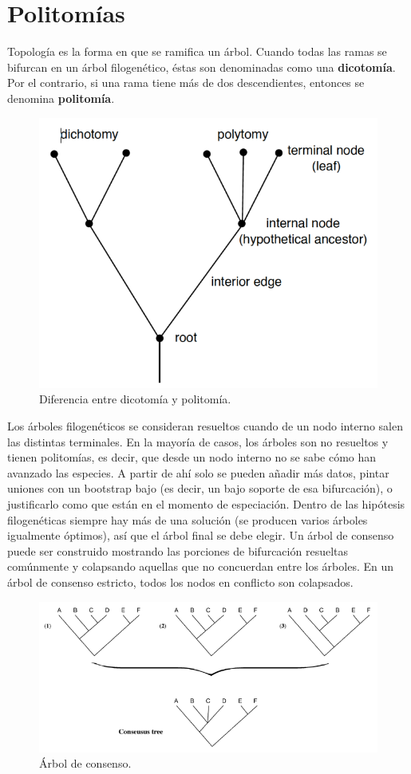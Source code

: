 \section{Politomías}
Topología es la forma en que se ramifica un árbol. Cuando todas las ramas se bifurcan en un árbol filogenético, éstas son denominadas como una \textbf{dicotomía}. Por el contrario, si una rama tiene más de dos descendientes, entonces se denomina \textbf{politomía}.

\begin{figure}[htbp]
\centering
\includegraphics[width=0.3\linewidth]{figs/dichotomy-polytomy.png}
\caption{Diferencia entre dicotomía y politomía.}
\end{figure}

Los árboles filogenéticos se consideran resueltos cuando de un nodo interno salen las distintas terminales. En la mayoría de casos, los árboles son no resueltos y tienen politomías, es decir, que desde un nodo interno no se sabe cómo han avanzado las especies. A partir de ahí solo se pueden añadir más datos, pintar uniones con un bootstrap bajo (es decir, un bajo soporte de esa bifurcación), o justificarlo como que están en el momento de especiación. Dentro de las hipótesis filogenéticas siempre hay más de una solución (se producen varios árboles igualmente óptimos), así que el árbol final se debe elegir. Un árbol de consenso puede ser construido mostrando las porciones de bifurcación resueltas comúnmente y colapsando aquellas que no concuerdan entre los árboles. En un árbol de consenso estricto, todos los nodos en conflicto son colapsados.

\begin{figure}[htbp]
\centering
\includegraphics[width=0.5\linewidth]{figs/consensus-tree.png}
\caption{Árbol de consenso.}
\end{figure}

